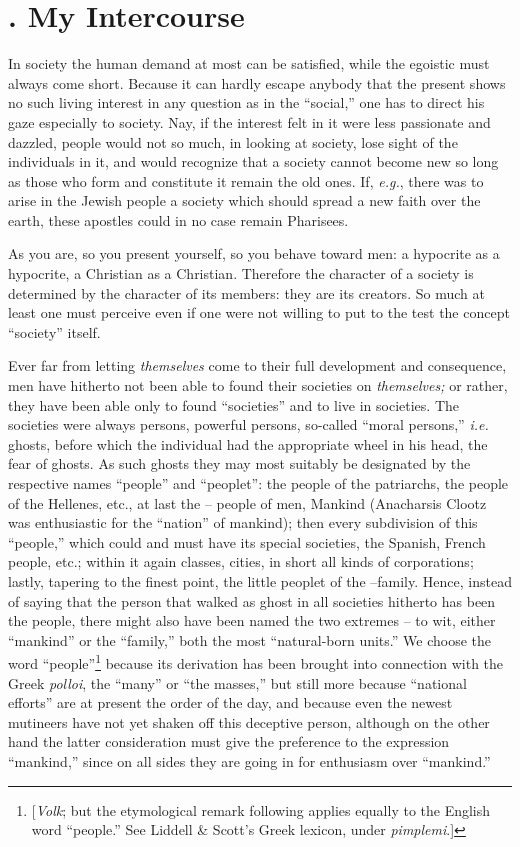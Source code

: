 \section[2. My Intercourse]{. My Intercourse}

In society the human demand at most can be satisfied, while the egoistic must 
always come short. Because it can hardly escape anybody that the present shows 
no such living interest in any question as in the ``social,'' one has to 
direct his gaze especially to society. Nay, if the interest felt in it were 
less passionate and dazzled, people would not so much, in looking at society, 
lose sight of the individuals in it, and would recognize that a society cannot 
become new so long as those who form and constitute it remain the old ones. 
If, \textit{e.g.}, there was to arise in the Jewish people a society which 
should spread a new faith over the earth, these apostles could in no case 
remain Pharisees.

As you are, so you present yourself, so you behave toward men: a hypocrite as 
a hypocrite, a Christian as a Christian. Therefore the character of a society 
is determined by the character of its members: they are its creators. So much 
at least one must perceive even if one were not willing to put to the test the 
concept ``society'' itself.

Ever far from letting \textit{themselves} come to their full development and 
consequence, men have hitherto not been able to found their societies on 
\textit{themselves;} or rather, they have been able only to found 
``societies'' and to live in societies. The societies were always persons, 
powerful persons, so-called ``moral persons,'' \textit{i.e.} ghosts, before 
which the individual had the appropriate wheel in his head, the fear of 
ghosts. As such ghosts they may most suitably be designated by the respective 
names ``people'' and ``peoplet'': the people of the patriarchs, the people 
of the Hellenes, etc., at last the -- people of men, Mankind (Anacharsis 
Clootz was enthusiastic for the ``nation'' of mankind); then every 
subdivision of this ``people,'' which could and must have its special 
societies, the Spanish, French people, etc.; within it again classes, cities, 
in short all kinds of corporations; lastly, tapering to the finest point, the 
little peoplet of the --family. Hence, instead of saying that the person that 
walked as ghost in all societies hitherto has been the people, there might 
also have been named the two extremes -- to wit, either ``mankind'' or the 
``family,'' both the most ``natural-born units.'' We choose the word 
``people''\footnote{[\textit{Volk}; but the etymological remark following 
applies equally to the English word ``people.'' See Liddell \& Scott's Greek 
lexicon, under \textit{pimplemi}.]} because its derivation has been brought 
into connection with the Greek \textit{polloi}, the ``many'' or ``the 
masses,'' but still more because ``national efforts'' are at present the 
order of the day, and because even the newest mutineers have not yet shaken 
off this deceptive person, although on the other hand the latter consideration 
must give the preference to the expression ``mankind,'' since on all sides 
they are going in for enthusiasm over ``mankind.''

